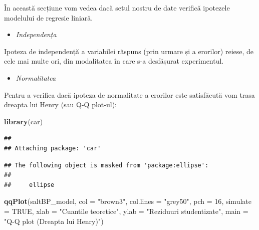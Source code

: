 \documentclass[]{article}
\newenvironment{Shaded}{\begin{snugshade}}{\end{snugshade}}
\newcommand{\KeywordTok}[1]{\textcolor[rgb]{0.13,0.29,0.53}{\textbf{{#1}}}}
\newcommand{\DataTypeTok}[1]{\textcolor[rgb]{0.13,0.29,0.53}{{#1}}}
\newcommand{\DecValTok}[1]{\textcolor[rgb]{0.00,0.00,0.81}{{#1}}}
\newcommand{\StringTok}[1]{\textcolor[rgb]{0.31,0.60,0.02}{{#1}}}
\newcommand{\OtherTok}[1]{\textcolor[rgb]{0.56,0.35,0.01}{{#1}}}
\newcommand{\NormalTok}[1]{{#1}}
\providecommand{\tightlist}{%
  \setlength{\itemsep}{0pt}\setlength{\parskip}{0pt}}
\begin{document}
În această secțiune vom vedea dacă setul nostru de date verifică
ipotezele modelului de regresie liniară.

\begin{itemize}
\tightlist
\item
  \emph{Independența}
\end{itemize}

Ipoteza de independență a variabilei răspuns (prin urmare și a erorilor)
reiese, de cele mai multe ori, din modalitatea în care s-a desfășurat
experimentul.

\begin{itemize}
\tightlist
\item
  \emph{Normalitatea}
\end{itemize}

Pentru a verifica dacă ipoteza de normalitate a erorilor este
satisfăcută vom trasa dreapta lui Henry (sau Q-Q plot-ul):

\begin{Shaded}
\begin{Highlighting}[]
\KeywordTok{library}\NormalTok{(car)}
\end{Highlighting}
\end{Shaded}

\begin{verbatim}
## 
## Attaching package: 'car'
\end{verbatim}

\begin{verbatim}
## The following object is masked from 'package:ellipse':
## 
##     ellipse
\end{verbatim}

\begin{Shaded}
\begin{Highlighting}[]
\KeywordTok{qqPlot}\NormalTok{(saltBP_model, }\DataTypeTok{col =} \StringTok{"brown3"}\NormalTok{, }\DataTypeTok{col.lines =} \StringTok{"grey50"}\NormalTok{, }\DataTypeTok{pch =} \DecValTok{16}\NormalTok{,}
       \DataTypeTok{simulate =} \OtherTok{TRUE}\NormalTok{,}
       \DataTypeTok{xlab =} \StringTok{"Cuantile teoretice"}\NormalTok{,}
       \DataTypeTok{ylab =} \StringTok{"Reziduuri studentizate"}\NormalTok{, }
       \DataTypeTok{main =} \StringTok{"Q-Q plot (Dreapta lui Henry)"}\NormalTok{)}
\end{Highlighting}
\end{Shaded}
\end{document}
